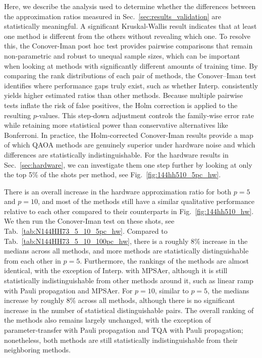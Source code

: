\documentclass[twocolumn,
english,
aps,
pra,
10pt,
longbibliography,
superscriptaddress,
amsmath,
amssymb,
floatfix
]{revtex4-2}
\begin{document}
{Here, we describe the analysis used to determine whether the differences between the approximation ratios measured in Sec.~\ref{sec:results_validation} are statistically meaningful.
A significant Kruskal-Wallis result indicates that at least one method is different from the others without revealing which one. 
To resolve this, the Conover-Iman post hoc test provides pairwise comparisons that remain non‑parametric and robust to unequal sample sizes, which can be important when looking at methods with significantly different amounts of training time.
By comparing the rank distributions of each pair of methods, the Conover–Iman test identifies where performance gaps truly exist, such as whether Interp. consistently yields higher estimated ratios than other methods.
Because multiple pairwise tests inflate the risk of false positives, the Holm correction is applied to the resulting $p$‑values.
This step‑down adjustment controls the family‑wise error rate while retaining more statistical power than conservative alternatives like Bonferroni.
In practice, the Holm-corrected Conover-Iman results provide a map of which QAOA methods are genuinely superior under hardware noise and which differences are statistically indistinguishable.
For the hardware results in Sec.~\ref{sec:hardware}, we can investigate them one step further by looking at only the top 5\% of the shots per method, see Fig.~\ref{fig:144hh510_5pc_hw}.


There is an overall increase in the hardware approximation ratio for both $p=5$ and $p=10$, and most of the methods still have a similar qualitative performance relative to each other compared to their counterparts in Fig.~\ref{fig:144hh510_hw}. We then run the Conover-Iman test on these shots, see Tab.~\ref{tab:N144HH73_5_10_5pc_hw}. Compared to Tab.~\ref{tab:N144HH73_5_10_100pc_hw}, there is a roughly 8\% increase in the medians across all methods, and more methods are statistically distinguishable from each other in $p=5$. Furthermore, the rankings of the methods are almost identical, with the exception of Interp. with MPSAer, although it is still statistically indistinguishable from other methods around it, such as linear ramp with Pauli propagation and MPSAer. For $p=10$,
similar to $p=5$, the medians increase by roughly 8\% across all methods, although there is no significant increase in the number of statistical distinguishable pairs. The overall ranking of the methods also remains largely unchanged, with the exception of parameter‑transfer with Pauli propagation and TQA with Pauli propagation; nonetheless, both methods are still statistically indistinguishable from their neighboring methods.

}
\end{document}
